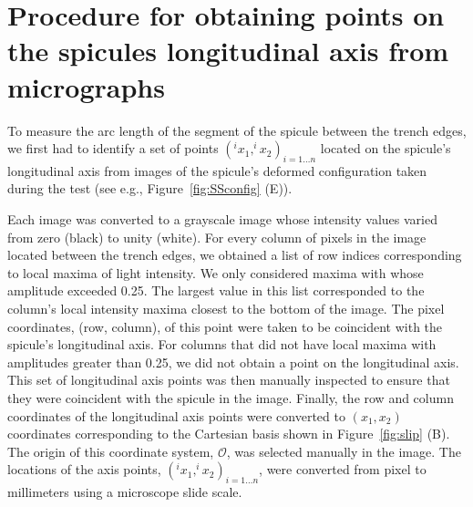 \section{Procedure for obtaining points on the spicules longitudinal axis from micrographs}
\label{sec:imageproc}

To measure the arc length of the segment of the spicule between the trench edges, we first had to identify a set of points $(^{i}x_1,^{i}x_2)_{i=1\ldots n}$ located on the spicule's longitudinal axis from images of the spicule's deformed configuration taken during the test (see e.g., Figure~\ref{fig:SSconfig} (\textsf{E})).

Each image was converted to a grayscale image whose intensity values varied from zero (black) to unity (white). For every column of pixels in the image located between the trench edges, we obtained a list of row indices corresponding to local maxima of light intensity. We only considered maxima with whose amplitude exceeded 0.25. The largest value in this list corresponded to the column's local intensity maxima closest to the bottom of the image. The pixel coordinates, (row, column), of this point were taken to be coincident with the spicule's longitudinal axis. For columns that did not have local maxima with amplitudes greater than 0.25, we did not obtain a point on the longitudinal axis. This set of longitudinal axis points was then manually inspected to ensure that they were coincident with the spicule in the image. Finally, the row and column coordinates of the longitudinal axis points were converted to $(x_1,x_2)$ coordinates corresponding to the Cartesian basis shown in Figure~\ref{fig:slip} (\textsf{B}). The origin of this coordinate system, $\mathcal{O}$, was selected manually in the image. The locations of the axis points, $(^{i}x_1,^{i}x_2)_{i=1\ldots n}$, were converted from pixel to millimeters using a microscope slide scale.

\clearpage

